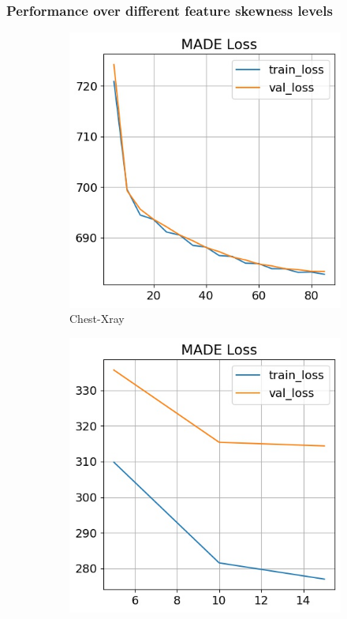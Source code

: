 \documentclass[mathfont=newtx]{uai2023} %
\begin{document}
\subsubsection{Performance over different feature skewness levels}
\begin{figure}[ht!]
	\centering
	\begin{subfigure}[t]{0.3\linewidth}	
		\includegraphics[width=\linewidth]{Figures/xray/MADE_loss}
		\caption{Chest-Xray }
		\label{fig:made_loss_xray}
	\end{subfigure}
	\hspace{0.01em}%
	\begin{subfigure}[t]{0.3\linewidth}
		\includegraphics[width=\linewidth]{Figures/femnist/MADE_loss}

\end{subfigure}
\end{figure}
\end{document}
